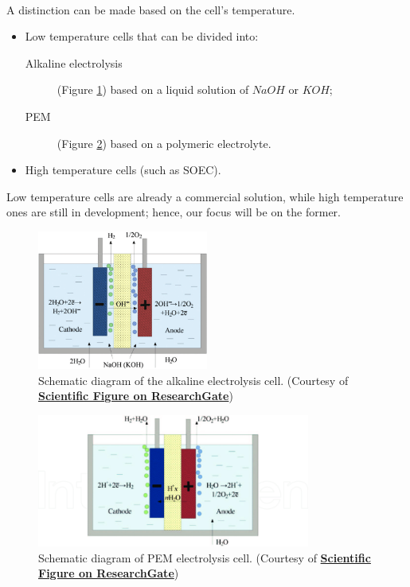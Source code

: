 A distinction can be made  based on the cell's temperature\textsuperscript{\cite{guanda20211}}.
\begin{itemize}
    \item Low temperature cells that can be divided into:
    \begin{description}
        \item[Alkaline electrolysis](Figure \ref{fig:alkaline})  based on a liquid solution of $NaOH$ or $KOH$;
        \item[PEM] (Figure \ref{fig:pem}) based on a polymeric electrolyte.
    \end{description}
    \item High temperature cells (such as SOEC).
\end{itemize}

Low temperature cells are already a commercial solution, while high temperature ones are still in development; hence, our focus will be on the former.

\begin{figure}[hp]
    \centering
    \includegraphics[width=0.5\textwidth]{Chapters/Pictures/Schematic-diagram-of-the-alkaline-electrolysis-cell-34.png}
    \caption{Schematic diagram of the alkaline electrolysis cell.
    (Courtesy of \textbf{\href{https://www.researchgate.net/figure/Schematic-diagram-of-the-alkaline-electrolysis-cell-34_fig4_327179309}{Scientific Figure on ResearchGate}})}
    \label{fig:alkaline}
\end{figure}

\begin{figure}[hp]
    \centering
    \includegraphics[width=0.8\textwidth]{Chapters/Pictures/Schematic-diagram-of-PEM-electrolysis-cell-33.png}
    \caption{Schematic diagram of PEM electrolysis cell.
    (Courtesy of \textbf{\href{https://www.researchgate.net/figure/Schematic-diagram-of-PEM-electrolysis-cell-33_fig1_327179309}{Scientific Figure on ResearchGate}})}
    \label{fig:pem}
\end{figure}

